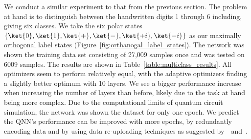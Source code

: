 \documentclass[a4paper,10pt]{article}
\begin{document}
We conduct a similar experiment to that from the previous section.
The problem at hand is to distinguish between the handwritten digits 1 through 6 including, giving six classes.
We take the six polar states $\{\ket{0}, \ket{1}, \ket{+}, \ket{-}, \ket{+i}, \ket{-i}\}$ as our maximally orthogonal label states (Figure~\ref{fig:orthanogal_label_states}).
The network was shown the training data set consisting of 27,009 samples once and was tested on 6009 samples.
The results are shown in Table~\ref{table:multiclass_results}.
All optimizers seem to perform relatively equal, with the adaptive optimizers finding a slightly better optimum with 10 layers.
We see a bigger performance increase when increasing the number of layers than before, likely due to the task at hand being more complex.
Due to the computational limits of quantum circuit simulation, the network was shown the dataset for only one epoch.
We predict the QNN's performance can be improved with more epochs, by redundantly encoding data and by using data re-uploading techniques as suggested by~\textcite{vidal2019input}~and~\textcite{perez2019data}.
\end{document}
